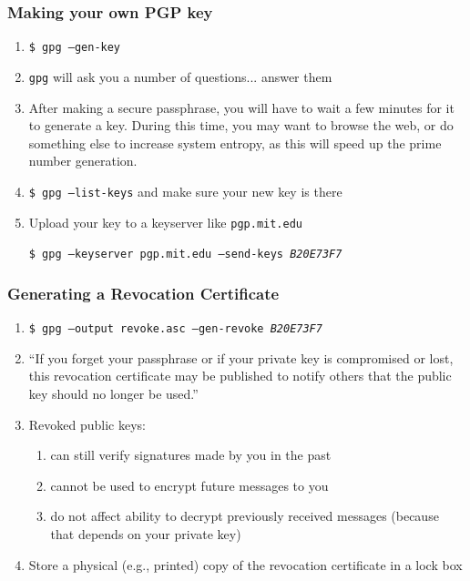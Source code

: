 \documentclass{beamer}
\begin{document}
\begin{frame}
    \frametitle{Making your own PGP key}
    \begin{enumerate}[<+->]
        \item \texttt{\$ gpg --gen-key}
        \item \texttt{gpg} will ask you a number of questions... answer them
        \item After making a secure passphrase, you will have to wait a few
            minutes for it to generate a key. During this time, you may want to
            browse the web, or do something else to increase system entropy, as
            this will speed up the prime number generation.
        \item \texttt{\$ gpg --list-keys} and make sure your new key is there
        \item Upload your key to a keyserver like \texttt{pgp.mit.edu}\par
            \texttt{\small \$ gpg --keyserver pgp.mit.edu --send-keys \emph{B20E73F7}}
    \end{enumerate}
\end{frame}

\begin{frame}
    \frametitle{Generating a Revocation Certificate}
        \begin{enumerate}[<+->]
            \item \texttt{\$ gpg --output revoke.asc --gen-revoke \emph{B20E73F7}}
            \item ``If you forget your passphrase or if your private key is compromised or lost, this revocation certificate may be published to
                notify others that the public key should no longer be used.''
            \item Revoked public keys:
                \begin{enumerate}
                    \item can still verify signatures made by you in the past
                    \item cannot be used to encrypt future messages to you
                    \item do not affect ability to decrypt previously received messages (because that depends on your private key)
                \end{enumerate}
            \item Store a physical (e.g., printed) copy of the revocation certificate in a lock box
        \end{enumerate}
\end{frame}
\end{document}
